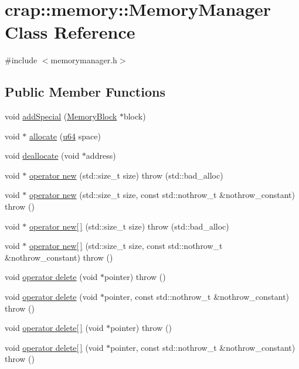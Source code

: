 \hypertarget{classcrap_1_1memory_1_1_memory_manager}{\section{crap\-:\-:memory\-:\-:Memory\-Manager Class Reference}
\label{classcrap_1_1memory_1_1_memory_manager}
}


{\ttfamily \#include $<$memorymanager.\-h$>$}

\subsection*{Public Member Functions}
\begin{DoxyCompactItemize}
\item 
void \hyperlink{classcrap_1_1memory_1_1_memory_manager_a1f6d7eda66e1e81742e9ffc1484303de}{add\-Special} (\hyperlink{classcrap_1_1memory_1_1_memory_block}{Memory\-Block} $\ast$block)
\item 
void $\ast$ \hyperlink{classcrap_1_1memory_1_1_memory_manager_a2de305d3b02ea6b30db859d3ff78faaf}{allocate} (\hyperlink{types_8h_a3f7e2bcbb0b4c338f3c4f6c937cd4234}{u64} space)
\item 
void \hyperlink{classcrap_1_1memory_1_1_memory_manager_a421b3b08b3d6c01846484d6571fa9c87}{deallocate} (void $\ast$address)
\item 
void $\ast$ \hyperlink{classcrap_1_1memory_1_1_memory_manager_a2a86c55fc4d25e1581aa5850a743514a}{operator new} (std\-::size\-\_\-t size)  throw (std\-::bad\-\_\-alloc)
\item 
void $\ast$ \hyperlink{classcrap_1_1memory_1_1_memory_manager_a23b175500aa6eadfd0ffec67ebd3a83f}{operator new} (std\-::size\-\_\-t size, const std\-::nothrow\-\_\-t \&nothrow\-\_\-constant)  throw ()
\item 
void $\ast$ \hyperlink{classcrap_1_1memory_1_1_memory_manager_a1b5cc79903382245afb3a1c203712ba9}{operator new\mbox{[}$\,$\mbox{]}} (std\-::size\-\_\-t size)  throw (std\-::bad\-\_\-alloc)
\item 
void $\ast$ \hyperlink{classcrap_1_1memory_1_1_memory_manager_a5446bc6ec8024b695241d5b5112eaa47}{operator new\mbox{[}$\,$\mbox{]}} (std\-::size\-\_\-t size, const std\-::nothrow\-\_\-t \&nothrow\-\_\-constant)  throw ()
\item 
void \hyperlink{classcrap_1_1memory_1_1_memory_manager_aba166c9c0bcf7ea9289a97b296eeb332}{operator delete} (void $\ast$pointer)  throw ()
\item 
void \hyperlink{classcrap_1_1memory_1_1_memory_manager_af79d0bfb3aad98208e9059bcbce9b61c}{operator delete} (void $\ast$pointer, const std\-::nothrow\-\_\-t \&nothrow\-\_\-constant)  throw ()
\item 
void \hyperlink{classcrap_1_1memory_1_1_memory_manager_a00b52595924f5a01837229baad985f13}{operator delete\mbox{[}$\,$\mbox{]}} (void $\ast$pointer)  throw ()
\item 
void \hyperlink{classcrap_1_1memory_1_1_memory_manager_a9ed0d381e84d12a7410e593915ca336c}{operator delete\mbox{[}$\,$\mbox{]}} (void $\ast$pointer, const std\-::nothrow\-\_\-t \&nothrow\-\_\-constant)  throw ()
\end{DoxyCompactItemize}
